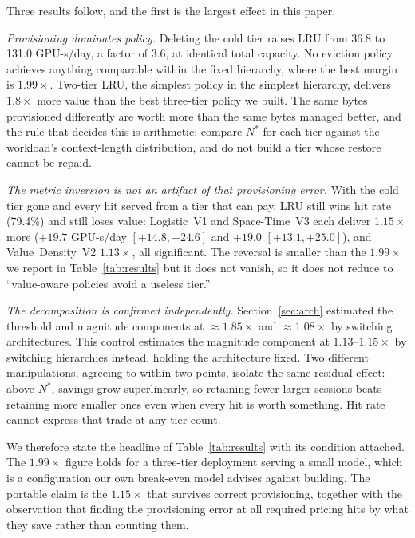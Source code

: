 \documentclass[letterpaper,twocolumn,10pt]{article}
\begin{document}
Three results follow, and the first is the largest effect in this paper.

\emph{Provisioning dominates policy.} Deleting the cold tier raises LRU from 36.8 to 131.0
GPU-s/day, a factor of $3.6$, at identical total capacity. No eviction policy achieves
anything comparable within the fixed hierarchy, where the best margin is $1.99\times$.
Two-tier LRU, the simplest policy in the simplest hierarchy, delivers $1.8\times$ more value
than the best three-tier policy we built. The same bytes provisioned differently are worth
more than the same bytes managed better, and the rule that decides this is arithmetic:
compare $N^{*}$ for each tier against the workload's context-length distribution, and do not
build a tier whose restore cannot be repaid.

\emph{The metric inversion is not an artifact of that provisioning error.} With the cold
tier gone and every hit served from a tier that can pay, LRU still wins hit rate (79.4\%)
and still loses value: Logistic~V1 and Space-Time~V3 each deliver $1.15\times$ more
($+19.7$ GPU-s/day $[+14.8, +24.6]$ and $+19.0$ $[+13.1, +25.0]$), and Value~Density~V2
$1.13\times$, all significant. The reversal is smaller than the $1.99\times$ we report in
Table~\ref{tab:results} but it does not vanish, so it does not reduce to ``value-aware
policies avoid a useless tier.''

\emph{The decomposition is confirmed independently.} Section~\ref{sec:arch} estimated the
threshold and magnitude components at ${\approx}1.85\times$ and ${\approx}1.08\times$ by
switching architectures. This control estimates the magnitude component at
$1.13$--$1.15\times$ by switching hierarchies instead, holding the architecture fixed. Two
different manipulations, agreeing to within two points, isolate the same residual effect:
above $N^{*}$, savings grow superlinearly, so retaining fewer larger sessions beats
retaining more smaller ones even when every hit is worth something. Hit rate cannot express
that trade at any tier count.

We therefore state the headline of Table~\ref{tab:results} with its condition attached. The
$1.99\times$ figure holds for a three-tier deployment serving a small model, which is a
configuration our own break-even model advises against building. The portable claim is the
$1.15\times$ that survives correct provisioning, together with the observation that finding
the provisioning error at all required pricing hits by what they save rather than counting
them.
\end{document}
